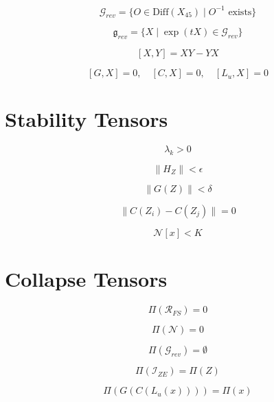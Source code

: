 \[
\mathcal{G}_{rev}
= \{ O \in \mathrm{Diff}(X_{45}) \mid O^{-1} \text{ exists} \}
\]

\[
\mathfrak{g}_{rev}
= \{ X \mid \exp(tX) \in \mathcal{G}_{rev} \}
\]

\[
[X,Y] = XY - YX
\]

\[
[G,X] = 0,\quad [C,X] = 0,\quad [L_u,X] = 0
\]


\section*{Stability Tensors}

\[
\lambda_k > 0
\]

\[
\|H_Z\| < \epsilon
\]

\[
\|G(Z)\| < \delta
\]

\[
\|C(Z_i) - C(Z_j)\| = 0
\]

\[
\mathcal{N}[x] < K
\]


\section*{Collapse Tensors}

\[
\Pi(\mathcal{R}_{FS}) = 0
\]

\[
\Pi(\mathcal{N}) = 0
\]

\[
\Pi(\mathcal{G}_{rev}) = \emptyset
\]

\[
\Pi(\mathcal{I}_{ZE}) = \Pi(Z)
\]

\[
\Pi(G(C(L_u(x)))) = \Pi(x)
\]

